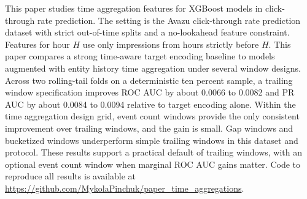 This paper studies time aggregation features for XGBoost models in click-through rate prediction.
The setting is the Avazu click-through rate prediction dataset with strict out-of-time splits and a no-lookahead feature constraint.
Features for hour $H$ use only impressions from hours strictly before $H$.
This paper compares a strong time-aware target encoding baseline to models augmented with entity history time aggregation under several window designs.
Across two rolling-tail folds on a deterministic ten percent sample, a trailing window specification improves ROC AUC by about 0.0066 to 0.0082 and PR AUC by about 0.0084 to 0.0094 relative to target encoding alone.
Within the time aggregation design grid, event count windows provide the only consistent improvement over trailing windows, and the gain is small.
Gap windows and bucketized windows underperform simple trailing windows in this dataset and protocol.
These results support a practical default of trailing windows, with an optional event count window when marginal ROC AUC gains matter. Code to reproduce all results is available at \url{https://github.com/MykolaPinchuk/paper_time_aggregations}.
